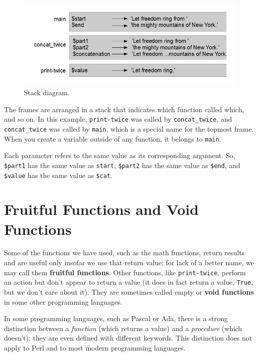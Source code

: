 \begin{figure}
\centerline
{\includegraphics[scale=0.8]{figs/stack_diagram.png}}
\caption{Stack diagram.}
\label{fig.stack}
\end{figure}


The frames are arranged in a stack that indicates which function
called which, and so on.  In this example, \verb"print-twice"
was called by \verb"concat_twice", and \verb"concat_twice" was called by 
\verb"main", which is a special name for the topmost frame.  When
you create a variable outside of any function, it belongs to 
\verb"main".

Each parameter refers to the same value as its corresponding
argument.  So, {\tt \$part1} has the same value as
{\tt start}, {\tt \$part2} has the same value as {\tt \$end},
and {\tt \$value} has the same value as {\tt \$cat}.


\section{Fruitful Functions and Void Functions}

Some of the functions we have used, such as the 
math functions, return results and are useful only insofar 
we use that return value; for lack of a better name, we 
may call them {\bf fruitful functions}.  Other functions, 
like \verb"print-twice", perform an action but don't appear 
to return a value (it does in fact return a value, {\tt True}, 
but we don't care about it).  They are sometimes called empty or 
{\bf void functions} in some other programming languages.

In some programming languages, such as Pascal or Ada, there 
is a strong distinction between a \emph{function} (which 
returns a value) and a \emph{procedure} (which doesn't); 
they are even defined with different keywords. This 
distinction does not apply to Perl and to most modern 
programming languages.

